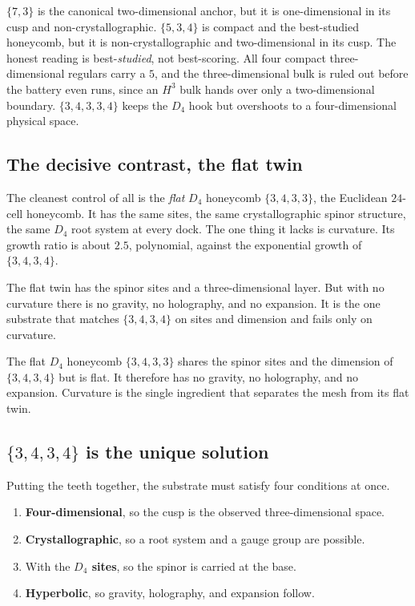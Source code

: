 $\{7,3\}$ is the canonical two-dimensional anchor, but it is one-dimensional in its cusp and non-crystallographic. $\{5,3,4\}$ is compact and the best-studied honeycomb, but it is non-crystallographic and two-dimensional in its cusp. The honest reading is best-\emph{studied}, not best-scoring. All four compact three-dimensional regulars carry a $5$, and the three-dimensional bulk is ruled out before the battery even runs, since an $H^3$ bulk hands over only a two-dimensional boundary. $\{3,4,3,3,4\}$ keeps the $D_4$ hook but overshoots to a four-dimensional physical space.

\subsection{The decisive contrast, the flat twin}

The cleanest control of all is the \emph{flat} $D_4$ honeycomb $\{3,4,3,3\}$, the Euclidean $24$-cell honeycomb. It has the same sites, the same crystallographic spinor structure, the same $D_4$ root system at every dock. The one thing it lacks is curvature. Its growth ratio is about $2.5$, polynomial, against the exponential growth of $\{3,4,3,4\}$.

The flat twin has the spinor sites and a three-dimensional layer. But with no curvature there is no gravity, no holography, and no expansion. It is the one substrate that matches $\{3,4,3,4\}$ on sites and dimension and fails only on curvature.

\begin{result}
The flat $D_4$ honeycomb $\{3,4,3,3\}$ shares the spinor sites and the dimension of $\{3,4,3,4\}$ but is flat. It therefore has no gravity, no holography, and no expansion. Curvature is the single ingredient that separates the mesh from its flat twin.
\end{result}

\subsection{$\{3,4,3,4\}$ is the unique solution}

Putting the teeth together, the substrate must satisfy four conditions at once.

\begin{enumerate}
\item \textbf{Four-dimensional}, so the cusp is the observed three-dimensional space.
\item \textbf{Crystallographic}, so a root system and a gauge group are possible.
\item With the \textbf{$D_4$ sites}, so the spinor is carried at the base.
\item \textbf{Hyperbolic}, so gravity, holography, and expansion follow.
\end{enumerate}

